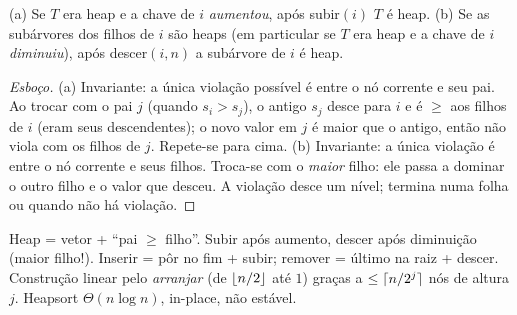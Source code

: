 \begin{prop}
(a) Se $T$ era heap e a chave de $i$ \emph{aumentou}, após subir$(i)$ $T$ é heap. (b) Se as subárvores dos filhos de $i$ são heaps (em particular se $T$ era heap e a chave de $i$ \emph{diminuiu}), após descer$(i,n)$ a subárvore de $i$ é heap.
\end{prop}
\begin{proof}[Esboço]
(a) Invariante: a única violação possível é entre o nó corrente e seu pai. Ao trocar com o pai $j$ (quando $s_i>s_j$), o antigo $s_j$ desce para $i$ e é $\ge$ aos filhos de $i$ (eram seus descendentes); o novo valor em $j$ é maior que o antigo, então não viola com os filhos de $j$. Repete-se para cima. (b) Invariante: a única violação é entre o nó corrente e seus filhos. Troca-se com o \emph{maior} filho: ele passa a dominar o outro filho e o valor que desceu. A violação desce um nível; termina numa folha ou quando não há violação.
\end{proof}

\begin{chave}
Heap = vetor + ``pai $\ge$ filho''. Subir após aumento, descer após diminuição (maior filho!). Inserir = pôr no fim + subir; remover = último na raiz + descer. Construção linear pelo \emph{arranjar} (de $\lfloor n/2\rfloor$ até $1$) graças a $\le\lceil n/2^j\rceil$ nós de altura $j$. Heapsort $\Theta(n\log n)$, in-place, não estável.
\end{chave}
